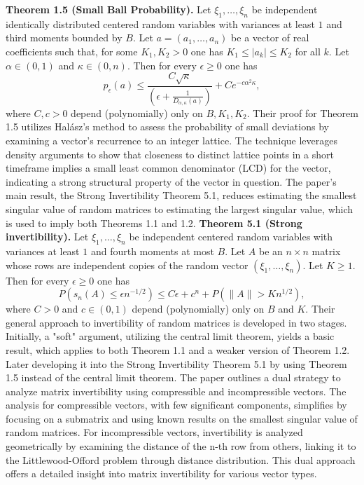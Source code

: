 \textbf{Theorem 1.5 (Small Ball Probability).} Let \(\xi_1, \ldots, \xi_n\) be independent identically distributed centered random variables with variances at least \(1\) and third moments bounded by \(B\). Let \(a = (a_1, \ldots, a_n)\) be a vector of real coefficients such that, for some \(K_1, K_2 > 0\) one has \(K_1 \leq |a_k| \leq K_2\) for all \(k\).
Let \(\alpha \in (0, 1)\) and \(\kappa \in (0, n)\). Then for every \(\epsilon \geq 0\) one has
\[p_{\epsilon}(a) \leq \frac{C\sqrt{\kappa}}{\left(\epsilon + \frac{1}{D_{\alpha,\kappa}(a)}\right)} + C e^{-c\alpha^2\kappa},\]
where \(C, c > 0\) depend (polynomially) only on \(B, K_1, K_2\).
\newline\newline
Their proof for Theorem 1.5 utilizes Halász's method to assess the probability of small deviations by examining a vector's recurrence to an integer lattice. The technique leverages density arguments to show that closeness to distinct lattice points in a short timeframe implies a small least common denominator (LCD) for the vector, indicating a strong structural property of the vector in question.\newline\newline
The paper's main result, the Strong Invertibility Theorem 5.1, reduces estimating the smallest singular value of random matrices to estimating the largest singular value, which is used to imply both Theorems 1.1 and 1.2.\newline\newline
\textbf{Theorem 5.1 (Strong invertibility).} Let \(\xi_1, \ldots, \xi_n\) be independent centered random variables with variances at least \(1\) and fourth moments at most \(B\). Let \(A\) be an \(n \times n\) matrix whose rows are independent copies of the random vector \((\xi_1, \ldots, \xi_n)\). Let \(K \geq 1\). Then for every \(\epsilon \geq 0\) one has
\[P(s_n(A) \leq \epsilon n^{-1/2}) \leq C\epsilon + c^n + P(\|A\| > K n^{1/2}),\]
where \(C > 0\) and \(c \in (0, 1)\) depend (polynomially) only on \(B\) and \(K\).\newline\newline
Their general approach to invertibility of random matrices is developed in two stages. Initially, a "soft" argument, utilizing the central limit theorem, yields a basic result, which applies to both Theorem 1.1 and a weaker version of Theorem 1.2. Later developing it into the Strong Invertibility Theorem 5.1 by using Theorem 1.5 instead of the central limit theorem.\newline\newline
The paper outlines a dual strategy to analyze matrix invertibility using compressible and incompressible vectors.
The analysis for compressible vectors, with few significant components, simplifies by focusing on a submatrix and using known results on the smallest singular value of random matrices.
For incompressible vectors, invertibility is analyzed geometrically by examining the distance of the n-th row from others, linking it to the Littlewood-Offord problem through distance distribution.
This dual approach offers a detailed insight into matrix invertibility for various vector types.